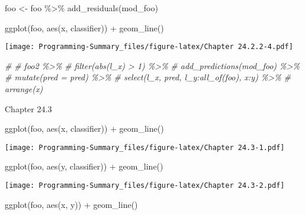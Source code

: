 \documentclass[
]{article}
\newenvironment{Shaded}{\begin{snugshade}}{\end{snugshade}}
\newcommand{\CommentTok}[1]{\textcolor[rgb]{0.56,0.35,0.01}{\textit{#1}}}
\newcommand{\FunctionTok}[1]{\textcolor[rgb]{0.00,0.00,0.00}{#1}}
\newcommand{\NormalTok}[1]{#1}
\newcommand{\OtherTok}[1]{\textcolor[rgb]{0.56,0.35,0.01}{#1}}
\newcommand{\SpecialCharTok}[1]{\textcolor[rgb]{0.00,0.00,0.00}{#1}}
\begin{document}
\begin{Shaded}
\begin{Highlighting}[]
\NormalTok{foo }\OtherTok{\textless{}{-}}\NormalTok{ foo }\SpecialCharTok{\%\textgreater{}\%} 
  \FunctionTok{add\_residuals}\NormalTok{(mod\_foo)}


\FunctionTok{ggplot}\NormalTok{(foo, }\FunctionTok{aes}\NormalTok{(x, classifier)) }\SpecialCharTok{+} 
  \FunctionTok{geom\_line}\NormalTok{()}
\end{Highlighting}
\end{Shaded}

\texttt{[image: Programming-Summary\_files/figure-latex/Chapter 24.2.2-4.pdf]}

\begin{Shaded}
\begin{Highlighting}[]
\CommentTok{\# }
\CommentTok{\# foo2 \%\textgreater{}\%}
\CommentTok{\# filter(abs(l\_x) \textgreater{} 1) \%\textgreater{}\%}
\CommentTok{\#  add\_predictions(mod\_foo) \%\textgreater{}\%}
\CommentTok{\#  mutate(pred = pred) \%\textgreater{}\%}
\CommentTok{\#  select(l\_x, pred, l\_y:all\_of(foo), x:y) \%\textgreater{}\%}
\CommentTok{\#  arrange(x)}
\end{Highlighting}
\end{Shaded}

Chapter 24.3

\begin{Shaded}
\begin{Highlighting}[]
\FunctionTok{ggplot}\NormalTok{(foo, }\FunctionTok{aes}\NormalTok{(x, classifier)) }\SpecialCharTok{+} 
  \FunctionTok{geom\_line}\NormalTok{()}
\end{Highlighting}
\end{Shaded}

\texttt{[image: Programming-Summary\_files/figure-latex/Chapter 24.3-1.pdf]}

\begin{Shaded}
\begin{Highlighting}[]
\FunctionTok{ggplot}\NormalTok{(foo, }\FunctionTok{aes}\NormalTok{(y, classifier)) }\SpecialCharTok{+} 
  \FunctionTok{geom\_line}\NormalTok{()}
\end{Highlighting}
\end{Shaded}

\texttt{[image: Programming-Summary\_files/figure-latex/Chapter 24.3-2.pdf]}

\begin{Shaded}
\begin{Highlighting}[]
\FunctionTok{ggplot}\NormalTok{(foo, }\FunctionTok{aes}\NormalTok{(x, y)) }\SpecialCharTok{+} 
  \FunctionTok{geom\_line}\NormalTok{()}
\end{Highlighting}
\end{Shaded}
\end{document}
